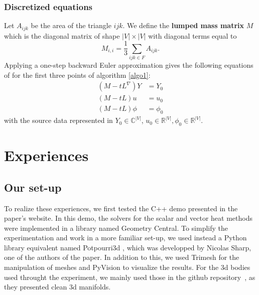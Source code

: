 \documentclass[sigconf]{acmart}
\begin{document}
\subsubsection{Discretized equations}
Let $A_{ijk}$ be the area of the triangle $ijk$. We define the \textbf{lumped mass matrix} $M$ which is the diagonal matrix of shape $|V| \times |V|$ with diagonal terms 
equal to $$M_{i,i} = \frac{1}{3}\sum_{ijk\in F}A_{ijk}.$$ Applying a one-step backward Euler approximation gives the following equations of for the first three points 
of algorithm \ref{algo1}:
\begin{align*}
 (M-tL^\nabla)Y & = Y_0 \\
 (M - tL)u & = u_0 \\
 (M - tL)\phi & = \phi_0
\end{align*}
with the source data represented in $Y_0\in \mathbb{C}^{|V|}$, $u_0 \in \mathbb{R}^|V|, \phi_0 \in \mathbb{R}^{|V|}$.

\section{Experiences}

\subsection{Our set-up}
To realize these experiences, we first tested the C++ demo presented in the paper's website.
In this demo, the solvers for the scalar and vector heat methods were implemented in a library named Geometry Central.
To simplify the experimentation and work in a more familiar set-up, we used instead a Python library equivalent named Potpourri3d \cite{library_potpourri3d}, 
which was developped by Nicolas Sharp, one of the authors of the paper.
In addition to this, we used Trimesh for the manipulation of meshes and PyVision to visualize the results.
For the 3d bodies used throught the experiment, we mainly used those in the github repository~\cite{github_objects_repo},
as they presented clean 3d manifolds.
\end{document}
